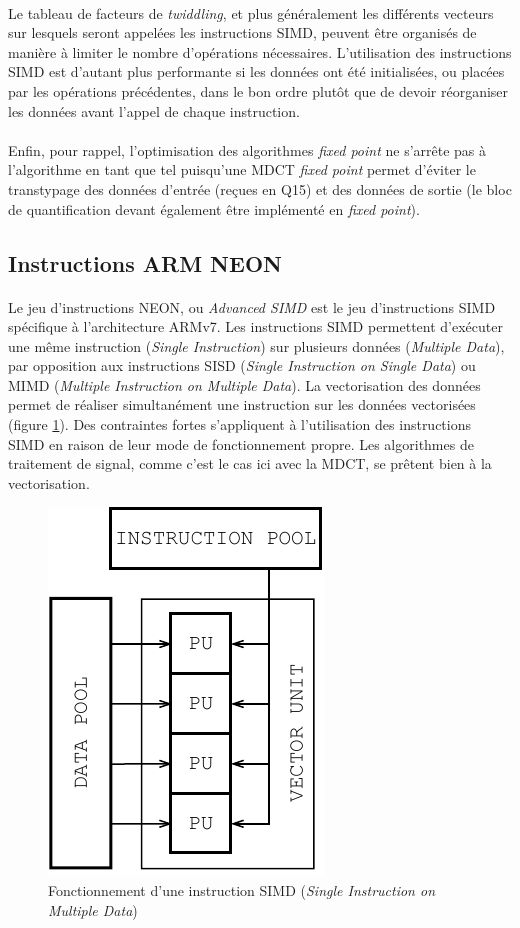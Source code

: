 \documentclass{article}
\begin{document}
    \paragraph{}
    Le tableau de facteurs de \emph{twiddling}, et plus généralement les différents vecteurs sur lesquels seront appelées les instructions SIMD, peuvent être organisés de manière à limiter le nombre d'opérations nécessaires. L'utilisation des instructions SIMD est d'autant plus performante si les données ont été initialisées, ou placées par les opérations précédentes, dans le bon ordre plutôt que de devoir réorganiser les données avant l'appel de chaque instruction.

    \paragraph{}
    Enfin, pour rappel, l'optimisation des algorithmes \emph{fixed point} ne s'arrête pas à l'algorithme en tant que tel puisqu'une MDCT \emph{fixed point} permet d'éviter le transtypage des données d'entrée (reçues en Q15) et des données de sortie (le bloc de quantification devant également être implémenté en \emph{fixed point}).


    \subsection{Instructions ARM NEON}
    \paragraph{}
    Le jeu d'instructions NEON, ou \emph{Advanced SIMD} est le jeu d'instructions SIMD spécifique à l'architecture ARMv7. Les instructions SIMD permettent d'exécuter une même instruction (\emph{Single Instruction}) sur plusieurs données (\emph{Multiple Data}), par opposition aux instructions SISD (\emph{Single Instruction on Single Data}) ou MIMD (\emph{Multiple Instruction on Multiple Data}). La vectorisation des données permet de réaliser simultanément une instruction sur les données vectorisées (figure \ref{fig:simd})\cite{wiki:SIMD}. Des contraintes fortes s'appliquent à l'utilisation des instructions SIMD en raison de leur mode de fonctionnement propre. Les algorithmes de traitement de signal, comme c'est le cas ici avec la MDCT, se prêtent bien à la vectorisation.

    \begin{figure}[H]
        \centering
        \includegraphics[width=.22\linewidth]{./images/SIMD.pdf}
        \caption{Fonctionnement d'une instruction SIMD (\emph{Single Instruction on Multiple Data})}
        \label{fig:simd}
    \end{figure}
    
\end{document}

